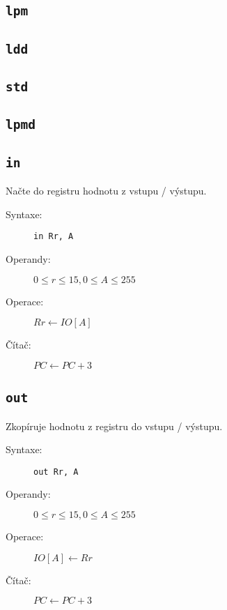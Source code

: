 \documentclass[a4,12pt]{article}
\newcommand{\instruction}[1]{\subsection{\texttt{#1}}\label{ins:#1}}
\newcommand{\syntax}[1]{\item[Syntaxe:] \texttt{#1} }
\newcommand{\operands}[1]{\item[Operandy:] \( #1 \) }
\newcommand{\operation}[1]{\item[Operace:] \( #1 \) }
\newcommand{\counter}[1]{\item[Čítač:] \( PC \leftarrow PC + #1 \) }
\newcommand{\reg}[1]{0 \leq #1 \leq 15}
\newcommand{\byte}[1]{0 \leq #1 \leq 255}
\begin{document}
\instruction{lpm}


\instruction{ldd}
\instruction{std}
\instruction{lpmd}

\instruction{in}

Načte do registru hodnotu z vstupu / výstupu.

\begin{description}
	\syntax{in Rr, A}
	\operands{\reg{r}, \byte{A}}
	\operation{Rr \leftarrow IO[A]}
	\counter{3}
\end{description}

\instruction{out}

Zkopíruje hodnotu z registru do vstupu / výstupu.

\begin{description}
	\syntax{out Rr, A}
	\operands{\reg{r}, \byte{A}}
	\operation{IO[A] \leftarrow Rr}
	\counter{3}
\end{description}
\end{document}

